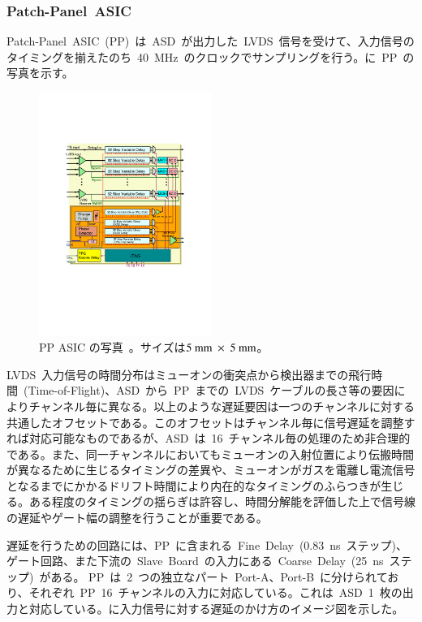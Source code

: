 \subsubsection{Patch-Panel~ASIC}
Patch-Panel~ASIC~(PP)~は~ASD~が出力した~LVDS~信号を受けて、入力信号のタイミングを揃えたのち~40~MHz~のクロックでサンプリングを行う。に~PP~の写真を示す。

\begin{figure}[tbp]
        \centering   
        \includegraphics[width=0.5\textwidth,page=2]{img/pdf/PP.pdf}
        \caption[PP ASIC の写真]{PP ASIC の写真~\cite{URL:05}。サイズは$5~\rm{mm}~\times~5~\rm{mm}$。}
        \label{fig:PPphoto}
\end{figure}

LVDS~入力信号の時間分布はミューオンの衝突点から検出器までの飛行時間~(Time-of-Flight)、ASD~から~PP~までの~LVDS~ケーブルの長さ等の要因によりチャンネル毎に異なる。以上のような遅延要因は一つのチャンネルに対する共通したオフセットである。このオフセットはチャンネル毎に信号遅延を調整すれば対応可能なものであるが、ASD~は~16~チャンネル毎の処理のため非合理的である。また、同一チャンネルにおいてもミューオンの入射位置により伝搬時間が異なるために生じるタイミングの差異や、ミューオンがガスを電離し電流信号となるまでにかかるドリフト時間により内在的なタイミングのふらつきが生じる。ある程度のタイミングの揺らぎは許容し、時間分解能を評価した上で信号線の遅延やゲート幅の調整を行うことが重要である。

遅延を行うための回路には、PP~に含まれる~Fine~Delay~(0.83~ns~ステップ)、ゲート回路、また下流の~Slave~Board~の入力にある~Coarse~Delay~(25~ns~ステップ)~がある。
PP~は~2~つの独立なパート~Port-A、Port-B~に分けられており、それぞれ~PP~16~チャンネルの入力に対応している。これは~ASD~1~枚の出力と対応している。に入力信号に対する遅延のかけ方のイメージ図を示した。

